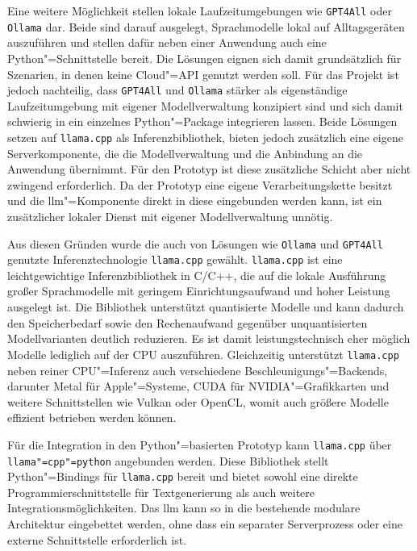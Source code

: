 Eine weitere Möglichkeit stellen lokale Laufzeitumgebungen wie \texttt{GPT4All} \autocite{GPT4All-Documentation} oder \texttt{Ollama} \autocite{Ollama-Documentation} dar. Beide sind darauf ausgelegt, Sprachmodelle lokal auf Alltagsgeräten auszuführen und stellen dafür neben einer Anwendung auch eine Python"=Schnittstelle bereit. Die Lösungen eignen sich damit grundsätzlich für Szenarien, in denen keine Cloud"=API genutzt werden soll. Für das Projekt ist jedoch nachteilig, dass \texttt{GPT4All}  und \texttt{Ollama} stärker als eigenständige Laufzeitumgebung mit eigener Modellverwaltung konzipiert sind und sich damit schwierig in ein einzelnes Python"=Package integrieren lassen. Beide Lösungen setzen auf \texttt{llama.cpp} als Inferenzbibliothek, bieten jedoch zusätzlich eine eigene Serverkomponente, die die Modellverwaltung und die Anbindung an die Anwendung übernimmt. Für den Prototyp ist diese zusätzliche Schicht aber nicht zwingend erforderlich. Da der Prototyp eine eigene Verarbeitungskette besitzt und die \gls{llm}"=Komponente direkt in diese eingebunden werden kann, ist ein zusätzlicher lokaler Dienst mit eigener Modellverwaltung unnötig.

Aus diesen Gründen wurde die auch von Lösungen wie \texttt{Ollama} und \texttt{GPT4All} genutzte Inferenztechnologie \texttt{llama.cpp} \autocite{LlamaCpp-Documentation} gewählt. \texttt{llama.cpp} ist eine leichtgewichtige Inferenzbibliothek in C/C++, die auf die lokale Ausführung großer Sprachmodelle mit geringem Einrichtungsaufwand und hoher Leistung ausgelegt ist. Die Bibliothek unterstützt quantisierte Modelle und kann dadurch den Speicherbedarf sowie den Rechenaufwand gegenüber unquantisierten Modellvarianten deutlich reduzieren. Es ist damit leistungstechnisch eher möglich Modelle lediglich auf der CPU auszuführen. Gleichzeitig unterstützt \texttt{llama.cpp} neben reiner CPU"=Inferenz auch verschiedene Beschleunigungs"=Backends, darunter Metal für Apple"=Systeme, CUDA für NVIDIA"=Grafikkarten und weitere Schnittstellen wie Vulkan oder OpenCL, womit auch größere Modelle effizient betrieben werden können.

Für die Integration in den Python"=basierten Prototyp kann \texttt{llama.cpp} über \texttt{llama"=cpp"=python} \autocite{Llamacpppython-Documentation} angebunden werden. Diese Bibliothek stellt Python"=Bindings für \texttt{llama.cpp} bereit und bietet sowohl eine direkte Programmierschnittstelle für Textgenerierung als auch weitere Integrationsmöglichkeiten. Das \gls{llm} kann so in die bestehende modulare Architektur eingebettet werden, ohne dass ein separater Serverprozess oder eine externe Schnittstelle erforderlich ist.


